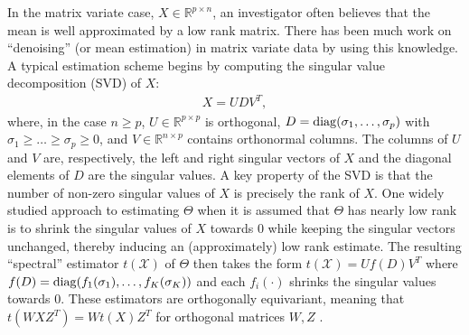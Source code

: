 In the matrix variate case, $X \in \mathbb{R}^{p \times n}$, an
investigator often believes that the mean is well approximated by a
low rank matrix. There has been much work on ``denoising'' (or mean
estimation) in matrix variate data by using this knowledge. A typical
estimation scheme begins by computing the singular value decomposition
(SVD) of $X$:
\begin{align}
  \label{equation:svd}
  X = UDV^T,
\end{align}
where, in the case $n \geq p$, $U \in \mathbb{R}^{p \times p}$ is
orthogonal, $D = \operatorname*{diag}(\sigma_1,\ldots,\sigma_p)$ with $\sigma_1 \geq
\ldots\geq \sigma_p \geq 0$, and $V \in \mathbb{R}^{n \times p}$
contains orthonormal columns. The columns of $U$ and $V$ are,
respectively, the left and right singular vectors of $X$ and the
diagonal elements of $D$ are the singular values. A key property of
the SVD is that the number of non-zero singular values of $X$ is
precisely the rank of $X$. One widely studied approach to estimating
$\Theta$ when it is assumed that $\Theta$ has nearly low rank is to
shrink the singular values of $X$ towards $0$ while keeping the
singular vectors unchanged, thereby inducing an (approximately) low
rank estimate. The resulting ``spectral'' estimator $t(\mathcal{X})$
of $\Theta$ then takes the form $t(\mathcal{X}) = Uf(D)V^T$ where
$f(D) = \operatorname*{diag}(f_1(\sigma_1),\ldots,f_K(\sigma_K))$ and each
$f_i(\cdot)$ shrinks the singular values towards $0$. These estimators
are orthogonally equivariant, meaning that $t(WXZ^T) = Wt(X)Z^T$ for
orthogonal matrices $W,Z$ \citep{shabalin2013reconstruction}.

